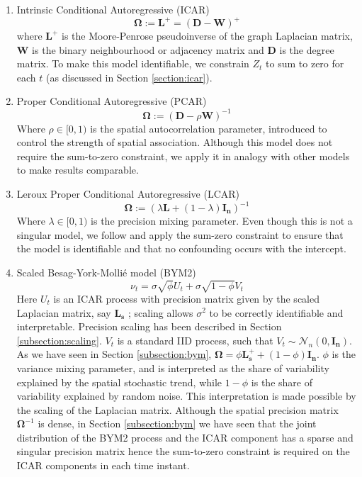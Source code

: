 \documentclass[openany, 11pt, oneside]{book}
\begin{document}
\begin{enumerate}
\item{Intrinsic Conditional Autoregressive (ICAR)}
$$
\boldsymbol{\Omega} := \boldsymbol{L^+} 
= \left(\boldsymbol{D}-\boldsymbol{W}\right)^+
$$
where $\boldsymbol{L^+}$ is the Moore-Penrose pseudoinverse of the graph Laplacian matrix, $\boldsymbol{W}$ is the binary neighbourhood or adjacency matrix and $\boldsymbol{D}$ is the degree matrix. To make this model identifiable, we constrain $Z_t$ to sum to zero for each $t$ (as discussed in Section \ref{section:icar}).
\item{Proper Conditional Autoregressive (PCAR)}
$$
\boldsymbol{\Omega} := (\boldsymbol{D} - \rho \boldsymbol{W})^{-1}
$$
Where $\rho \in [0, 1)$ is the spatial autocorrelation parameter, introduced to control the strength of spatial association. Although this model does not require the sum-to-zero constraint, we apply it in analogy with other models to make results comparable. 
\item{Leroux Proper Conditional Autoregressive (LCAR)}
$$
\boldsymbol{\Omega} := \left(\lambda \boldsymbol{L} + (1-\lambda) \boldsymbol{I_n} \right)^{-1}
$$
Where $\lambda \in [0, 1)$ is the precision mixing parameter. Even though this is not a singular model, we follow \cite{Goicoa} and apply the sum-zero constraint to ensure that the model is identifiable and that no confounding occurs with the intercept. 
\item{Scaled Besag-York-Mollié model (BYM2)}
$$
\nu_t = \sigma \sqrt{\phi}U_t + \sigma \sqrt{1-\phi} V_t
$$
Here $U_t$ is an ICAR process with precision matrix given by the scaled Laplacian matrix, say $\boldsymbol{L_s}$ \parencite{Sorbye, BYM2}; scaling allows $\sigma^2$ to be correctly identifiable and interpretable. Precision scaling has been described in Section \ref{subsection:scaling}. $V_t$ is a standard IID process, such that $V_t \sim \mathcal{N}_n \left(0, \boldsymbol{I_n}\right)$. As we have seen in Section \ref{subsection:bym}, $\boldsymbol{\Omega} = \phi \boldsymbol{L_s^+} + (1-\phi)\boldsymbol{I_n}$. $\phi$ is the variance mixing parameter, and is interpreted as the share of variability explained by the spatial stochastic trend, while $1-\phi$ is the share of variability explained by random noise. This interpretation is made possible by the scaling of the Laplacian matrix. Although the spatial precision matrix $\boldsymbol{\Omega}^{-1}$ is dense, in Section \ref{subsection:bym} we have seen that the joint distribution of the BYM2 process and the ICAR component has a sparse and singular precision matrix \parencite{BYM2} hence the sum-to-zero constraint is required on the ICAR components in each time instant.
\end{enumerate}
\end{document}
